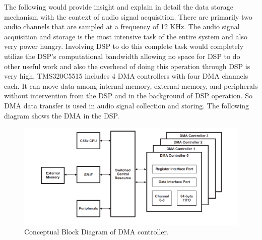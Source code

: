  The following would provide insight and explain in detail the data storage mechanism with the context of audio signal acquisition. There are primarily two audio channels that are sampled at a frequency of 12 KHz. The audio signal acquisition and storage is the most intensive task of the entire system and also very power hungry. Involving DSP to do this complete task would completely utilize the DSP's computational bandwidth allowing no space for DSP to do other useful work and also the overhead of doing this operation through DSP is very high. TMS320C5515 includes 4 DMA controllers with four DMA channels each. It can move data among internal memory, external memory, and peripherals without intervention from the DSP and in the background of DSP operation. So DMA data transfer is used in audio signal collection and storing. The following diagram shows the DMA in the DSP. 
 \begin{figure}[h]
 	\centering
 	\includegraphics[scale = 0.5 ]{DMA_overview.JPG}
 	\caption{Conceptual Block Diagram of DMA controller. \cite{dma}\label{DMA_Architecture}}
 \end{figure} 



